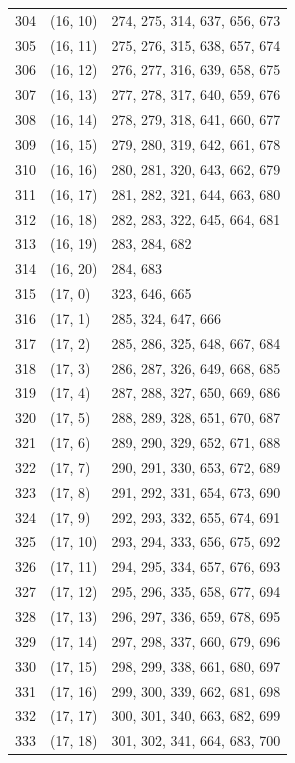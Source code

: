 \documentclass{article}
\begin{document}
\begin{longtable}{lll}
  304 & (16, 10) & 274, 275, 314, 637, 656, 673 \\
  305 & (16, 11) & 275, 276, 315, 638, 657, 674 \\
  306 & (16, 12) & 276, 277, 316, 639, 658, 675 \\
  307 & (16, 13) & 277, 278, 317, 640, 659, 676 \\
  308 & (16, 14) & 278, 279, 318, 641, 660, 677 \\
  309 & (16, 15) & 279, 280, 319, 642, 661, 678 \\
  310 & (16, 16) & 280, 281, 320, 643, 662, 679 \\
  311 & (16, 17) & 281, 282, 321, 644, 663, 680 \\
  312 & (16, 18) & 282, 283, 322, 645, 664, 681 \\
  313 & (16, 19) & 283, 284, 682 \\
  314 & (16, 20) & 284, 683 \\
  315 & (17, 0) & 323, 646, 665 \\
  316 & (17, 1) & 285, 324, 647, 666 \\
  317 & (17, 2) & 285, 286, 325, 648, 667, 684 \\
  318 & (17, 3) & 286, 287, 326, 649, 668, 685 \\
  319 & (17, 4) & 287, 288, 327, 650, 669, 686 \\
  320 & (17, 5) & 288, 289, 328, 651, 670, 687 \\
  321 & (17, 6) & 289, 290, 329, 652, 671, 688 \\
  322 & (17, 7) & 290, 291, 330, 653, 672, 689 \\
  323 & (17, 8) & 291, 292, 331, 654, 673, 690 \\
  324 & (17, 9) & 292, 293, 332, 655, 674, 691 \\
  325 & (17, 10) & 293, 294, 333, 656, 675, 692 \\
  326 & (17, 11) & 294, 295, 334, 657, 676, 693 \\
  327 & (17, 12) & 295, 296, 335, 658, 677, 694 \\
  328 & (17, 13) & 296, 297, 336, 659, 678, 695 \\
  329 & (17, 14) & 297, 298, 337, 660, 679, 696 \\
  330 & (17, 15) & 298, 299, 338, 661, 680, 697 \\
  331 & (17, 16) & 299, 300, 339, 662, 681, 698 \\
  332 & (17, 17) & 300, 301, 340, 663, 682, 699 \\
  333 & (17, 18) & 301, 302, 341, 664, 683, 700 \\

\end{longtable}
\end{document}
